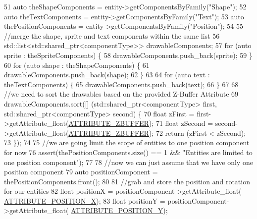 \begin{DoxyCode}
51         \textcolor{keyword}{auto} theShapeComponents = entity->getComponentsByFamily(\textcolor{stringliteral}{"Shape"});
52         \textcolor{keyword}{auto} theTextComponents = entity->getComponentsByFamily(\textcolor{stringliteral}{"Text"});
53         \textcolor{keyword}{auto} thePositionComponents = entity->getComponentsByFamily(\textcolor{stringliteral}{"Position"});
54 
55         \textcolor{comment}{//merge the shape, sprite and text components within the same list}
56         std::list<std::shared\_ptr<componentType>> drawableComponents;
57         \textcolor{keywordflow}{for} (\textcolor{keyword}{auto} sprite : theSpriteComponents) \{
58             drawableComponents.push\_back(sprite);
59         \}
60         \textcolor{keywordflow}{for} (\textcolor{keyword}{auto} shape : theShapeComponents) \{
61             drawableComponents.push\_back(shape);
62         \}
63 
64         \textcolor{keywordflow}{for} (\textcolor{keyword}{auto} text : theTextComponents) \{
65             drawableComponents.push\_back(text);
66         \}
67 
68         \textcolor{comment}{//we need to sort the drawables based on the provided Z-Buffer Attribute}
69         drawableComponents.sort([] (std::shared\_ptr<componentType> first, std::shared\_ptr<componentType> 
      second) \{
70             \textcolor{keywordtype}{float} zFirst = first->getAttribute\_float(\hyperlink{_a_e___attributes_8h_af11539bb711833d6321aaccd369e9e4b}{ATTRIBUTE\_ZBUFFER});
71             \textcolor{keywordtype}{float} zSecond = second->getAttribute\_float(\hyperlink{_a_e___attributes_8h_af11539bb711833d6321aaccd369e9e4b}{ATTRIBUTE\_ZBUFFER});
72             \textcolor{keywordflow}{return} (zFirst < zSecond);
73         \});
74 
75         \textcolor{comment}{//we are going limit the scope of entities to one position component for now}
76         assert(thePositionComponents.size() == 1 && \textcolor{stringliteral}{"Entities are limited to one position component"});
77 
78         \textcolor{comment}{//now we can just assume that we have only one position component}
79         \textcolor{keyword}{auto} positionComponent = thePositionComponents.front();
80 
81         \textcolor{comment}{//grab and store the position and rotation for our entities}
82         \textcolor{keywordtype}{float} positionX = positionComponent->getAttribute\_float(
      \hyperlink{_a_e___attributes_8h_af6d494c0177e73da9ce2c06e77d8ca03}{ATTRIBUTE\_POSITION\_X});
83         \textcolor{keywordtype}{float} positionY = positionComponent->getAttribute\_float(
      \hyperlink{_a_e___attributes_8h_a38e831ab6c249750393e3007fa035507}{ATTRIBUTE\_POSITION\_Y});

\end{DoxyCode}
